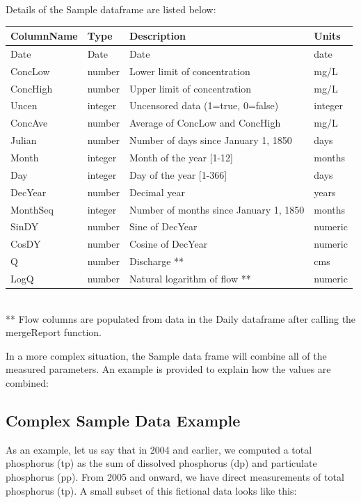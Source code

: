 \documentclass[a4paper,11pt]{article}
\begin{document}
Details of the Sample dataframe are listed below:

\begin{tabular}{llll}
  \hline
ColumnName & Type & Description & Units \\ 
  \hline
Date & Date & Date & date \\ 
  ConcLow & number & Lower limit of concentration & mg/L \\ 
  ConcHigh & number & Upper limit of concentration & mg/L \\ 
  Uncen & integer & Uncensored data (1=true, 0=false) & integer \\ 
  ConcAve & number & Average of ConcLow and ConcHigh & mg/L \\ 
  Julian & number & Number of days since January 1, 1850 & days \\ 
  Month & integer & Month of the year [1-12] & months \\ 
  Day & integer & Day of the year [1-366] & days \\ 
  DecYear & number & Decimal year & years \\ 
  MonthSeq & integer & Number of months since January 1, 1850 & months \\ 
  SinDY & number & Sine of DecYear & numeric \\ 
  CosDY & number & Cosine of DecYear & numeric \\ 
  Q & number & Discharge ** & cms \\ 
  LogQ & number & Natural logarithm of flow ** & numeric \\ 
   \hline
\end{tabular}\\
** Flow columns are populated from data in the Daily dataframe after calling the mergeReport function.


In a more complex situation, the Sample data frame will combine all of the measured parameters.  An example is provided to explain how the values are combined:

\subsection{Complex Sample Data Example}
As an example, let us say that in 2004 and earlier, we computed a total phosphorus (tp) as the sum of dissolved phosphorus (dp) and particulate phosphorus (pp). From 2005 and onward, we have direct measurements of total phosphorus (tp). A small subset of this fictional data looks like this:
\end{document}
